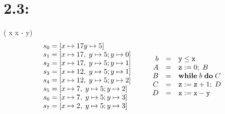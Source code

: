 \documentclass[a1paper]{paper}
\begin{document}
\section*{2.3:}
 { ({ {\cass x {\cvar x - \cvar y}}})} \\
\[
\begin{array}[t]{l@{\quad\quad}l}
\begin{array}{r@{\;=\;}l}
s_0 & [x\mapsto 17 y\mapsto 5] \\
s_1 & [x\mapsto 17,\; y\mapsto 5; y\mapsto 0] \\
s_2 & [x\mapsto 17,\; y\mapsto 5; y\mapsto 1] \\
s_3 & [x\mapsto 12,\; y\mapsto 5; y\mapsto 1] \\
s_4 & [x\mapsto 12,\; y\mapsto 5; y\mapsto 2] \\
s_5 & [x\mapsto 7, \; y\mapsto 5; y\mapsto 2] \\
s_6 & [x\mapsto 7, \; y\mapsto 5; y\mapsto 3] \\
s_7 & [x\mapsto 2, \; y\mapsto 5; y\mapsto 3] \\
\end{array}
&
\begin{array}{r@{\quad=\quad}l}
b & \cvar{y}\le\cvar{x} \\
A & \ccomp {\cass z 0} B \\
B & \cwhile b C \\
C & \ccomp {\cass z {\cvar z + 1}} D \\
D & \cass x {\cvar x - \cvar y} \\
\end{array}
\end{array}
\]
\end{document}
